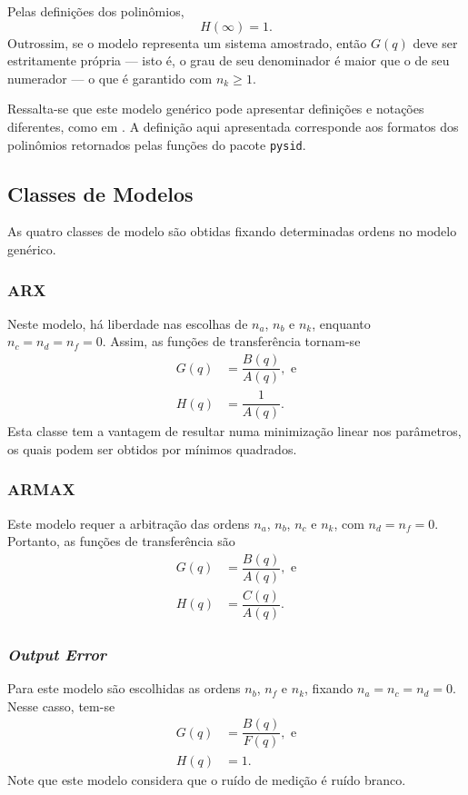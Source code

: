 \documentclass{ppgeesa}
\begin{document}
Pelas definições dos polinômios,
\begin{equation}\label{eq:H-inf}
  H(\infty) = 1
  .
\end{equation}
Outrossim, se o modelo representa um sistema amostrado, então $G(q)$ deve ser estritamente própria --- isto é, o grau de seu denominador é maior que o de seu numerador --- o que é garantido com $n_k \geq 1$.

Ressalta-se que este modelo genérico pode apresentar definições e notações diferentes, como em \cite{book:Ljung1999, book:Aguirre2007, misc:matlab-polynomial-models}.
A definição aqui apresentada corresponde aos formatos dos polinômios retornados pelas funções do pacote \texttt{pysid}.


\subsection{Classes de Modelos}
As quatro classes de modelo são obtidas fixando determinadas ordens no modelo genérico.

\subsubsection{ARX}
Neste modelo, há liberdade nas escolhas de $n_a$, $n_b$ e $n_k$, enquanto $n_c = n_d = n_f = 0$.
Assim, as funções de transferência tornam-se
\begin{align}
  G(q) &= \dfrac{B(q)}{A(q)}
  , \text{ e}
  \\
  H(q) &= \dfrac{1}{A(q)}
  .
\end{align}
Esta classe tem a vantagem de resultar numa minimização linear nos parâmetros, os quais podem ser obtidos por mínimos quadrados.

\subsubsection{ARMAX}
Este modelo requer a arbitração das ordens $n_a$, $n_b$, $n_c$ e $n_k$, com $n_d = n_f = 0$.
Portanto, as funções de transferência são
\begin{align}
  G(q) &= \dfrac{B(q)}{A(q)}
  , \text{ e}
  \\
  H(q) &= \dfrac{C(q)}{A(q)}
  .
\end{align}

\subsubsection{\emph{Output Error}}
Para este modelo são escolhidas as ordens $n_b$, $n_f$ e $n_k$, fixando $n_a = n_c = n_d = 0$.
Nesse casso, tem-se
\begin{align}
  G(q) &= \dfrac{B(q)}{F(q)}
  , \text{ e}
  \\
  H(q) &= 1
  .
\end{align}
Note que este modelo considera que o ruído de medição é ruído branco. %
\end{document}
